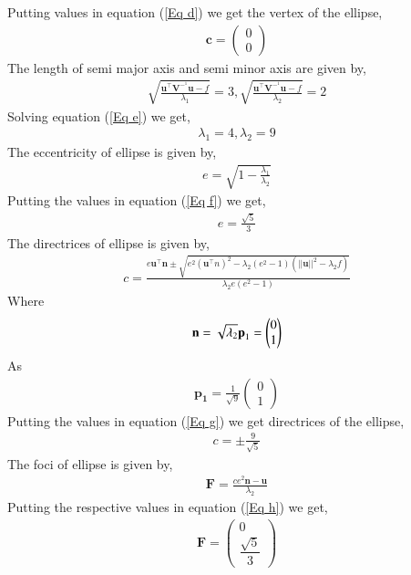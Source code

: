 \documentclass[twocolumn]{article}
\theoremstyle{remark}
\newcommand{\myvec}[1]{\ensuremath{\begin{pmatrix}#1\end{pmatrix}}}
\numberwithin{equation}{subsection}
\let\vec\mathbf
\begin{document}
Putting values in equation (\ref{Eq d}) we get the vertex of the ellipse,
\begin{align}
\vec{c}=\myvec{0 \\ 0}
\end{align}
The length of semi major axis and semi minor axis are given by,
\begin{align} \label{Eq e}
\sqrt{\frac{\textbf{u}^\top \textbf{V}^-^1 \textbf{u} - f}{ \lambda_1}} = 3   ,   \sqrt{\frac{\textbf{u}^\top \textbf{V}^-^1 \textbf{u} - f}{ \lambda_2}} = 2
 \end{align}
Solving equation (\ref{Eq e}) we get,
\begin{align} 
\lambda_1 = 4   ,   \lambda_2 = 9
\end{align}
The eccentricity of ellipse is given by,
\begin{align} \label{Eq f}
e = \sqrt{1 - \frac{\lambda_1}{\lambda_2}}
\end{align}
Putting the values in equation (\ref{Eq f}) we get,
\begin{align}
e = \frac{\sqrt{5}}{3}
\end{align}
The directrices of ellipse is given by,
\begin{align} \label{Eq g}
c = \frac{e \textbf{u}^\top \textbf{n} \pm \sqrt{e^2 (\textbf{u}^\top n)^2 - \lambda_2 (e^2 - 1) (||\textbf{u}||^2 - \lambda_2 f)}}{\lambda_2 e (e^2 - 1)}
\end{align}
Where
\begin{align}
\vec{n} = \sqrt{\lambda_2} \textbf p_1 = \myvec{0 \\ 1}
\end{align}
As
\begin{align}
 \vec{p_1} = \frac{1}{\sqrt{9}} \myvec{0 \\ 1}
\end{align}
Putting the values in equation (\ref{Eq g}) we get directrices of the ellipse,
\begin{align}
c = \pm \frac{9}{\sqrt{5}}
\end{align}
The foci of ellipse is given by,
\begin{align} \label{Eq h}
\textbf{F} = \frac{c e^2 \textbf{n} - \textbf{u}}{\lambda_2}
\end{align}
Putting the respective values in equation (\ref{Eq h}) we get,
\begin{align}
\vec{F}=\myvec{0 \\ \dfrac{\sqrt{5}}{3}}
\end{align}
\end{document}

